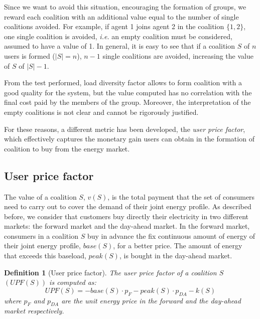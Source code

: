 \documentclass[11pt, twoside, titlepage, a4paper, openright]{report}
\newtheorem{Def}{Definition}
\begin{document}
Since we want to avoid this situation, encouraging the formation of groups, we reward each coalition with an additional value equal to the number of single coalitions avoided. For example, if agent 1 joins agent 2 in the coalition $\{1,2\}$, one single coalition is avoided, \textit{i.e.} an empty coalition must be considered, assumed to have a value of 1. In general, it is easy to see that if a coalition $S$ of $n$ users is formed ($|S|=n$), $n-1$ single coalitions are avoided, increasing the value of $S$ of $|S|-1$.

\noindent From the test performed, load diversity factor allows to form coalition with a good quality for the system, but the value computed has no correlation with the final cost paid by the members of the group. Moreover, the interpretation of the empty coalitions is not clear and cannot be rigorously justified.

For these reasons, a different metric has been developed, the \textit{user price factor}, which effectively captures the monetary gain users can obtain in the formation of coalition to buy from the energy market.

\subsection{User price factor}\label{sec:upf}

The value of a coalition $S$, $v(S)$, is the total payment that the set of
consumers need to carry out to cover the demand of their joint energy profile. As described before, we consider that
customers buy directly their electricity in two different markets: the forward
market and the day-ahead market. In the forward market, consumers in a coalition
$S$ buy in advance the fix continuous amount of energy of their joint
energy profile, $base(S)$, for a better price. The amount of energy that exceeds
this baseload, $peak(S)$, is bought in the day-ahead market.

\begin{Def}[User price factor]\label{def:upf}
The \textit{user price factor} of a coalition $S$ $(UPF(S))$ is computed as:
\begin{equation}\label{eq:upf}UPF\left(S\right)=-base(S) \cdot p_{F} -peak\left(S\right) \cdot p_{DA}-k\left(S\right)\end{equation}
where $p_{F}$ and $p_{DA}$ are the unit energy price in the forward and the day-ahead market
respectively.
\end{Def}
\end{document}
